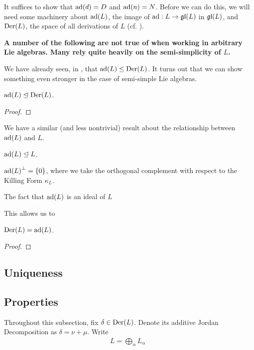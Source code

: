 It suffices to show that $\operatorname{ad}\!\left( d \right) = D$ and $\operatorname{ad}\!\left( n \right) = N$. Before we can do this, we will need some machinery about $\operatorname{ad}\!\left( L \right)$, the image of $\operatorname{ad} : L \to \mathfrak{gl}\!\left( L \right)$ in $\mathfrak{gl}\!\left( L \right)$, and $\operatorname{Der}\!\left( L \right)$, the space of all derivations of $L$ (cf. ).

\textbf{A number of the following are not true of when working in arbitrary Lie algebras. Many rely quite heavily on the semi-simplicity of $L$.}

We have already seen, in , that $\operatorname{ad}\!\left( L \right) \leq \operatorname{Der}\!\left( L \right)$. It turns out that we can show something even stronger in the case of semi-simple Lie algebras.

\begin{lemma}
    $\operatorname{ad}\!\left( L \right) \trianglelefteq \operatorname{Der}\!\left( L \right)$.
\end{lemma}
\begin{proof}
    
    \sorry
\end{proof}

We have a similar (and less nontrivial) result about the relationship between $\operatorname{ad}\!\left( L \right)$ and $L$.

\begin{lemma}
    $\operatorname{ad}\!\left( L \right) \trianglelefteq L$.
\end{lemma}

\begin{lemma}
    $\operatorname{ad}\!\left( L \right)^{\perp} = \left\{ 0 \right\}$, where we take the orthogonal complement with respect to the Killing Form $\kappa_{L}$.
\end{lemma}

The fact that $\operatorname{ad}\!\left( L \right)$ is an ideal of $L$ 

This allows us to 

\begin{boxproposition}
    $\operatorname{Der}\!\left( L \right) = \operatorname{ad}\!\left( L \right)$.
\end{boxproposition}
\begin{proof}
    
\end{proof}

\subsection{Uniqueness}

\subsection{Properties}

Throughout this subsection, fix $\delta \in \operatorname{Der}\!\left( L \right)$. Denote its additive Jordan Decomposition as $\delta = \nu + \mu$. Write
\begin{align*}
    L = \bigoplus_{\alpha} L_{\alpha}  %
\end{align*}

